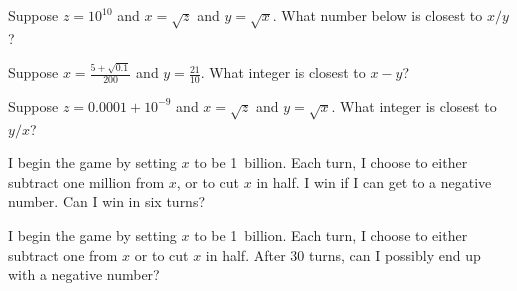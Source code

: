 \documentclass{ximera}
\begin{document}
\begin{shuffle}
\begin{problem}
  Suppose $z = 10^{10}$ and $x = \sqrt{z}$ and $y = \sqrt{x}$.  What number below is closest to $x/y$?
  \begin{multipleChoice}
  \end{multipleChoice}
\end{problem}

\begin{problem}
  Suppose $x = \frac{5 + \sqrt{0.1}}{200}$ and $y = \frac{21}{10}$.  What integer is closest to $x - y$?
  \begin{multipleChoice}
  \end{multipleChoice}
\end{problem}

\begin{problem}
  Suppose $z = 0.0001 + 10^{-9}$ and $x = \sqrt{z}$ and $y = \sqrt{x}$.  What integer is closest to $y/x$?
  \begin{multipleChoice}
  \end{multipleChoice}
\end{problem}

\begin{problem}
  I begin the game by setting $x$ to be 1~billion.  Each turn, I
  choose to either subtract one million from $x$, or to cut $x$ in
  half.  I win if I can get to a negative number.  Can I win in six
  turns?
  \begin{multipleChoice}
  \end{multipleChoice}
\end{problem}

\begin{problem}
  I begin the game by setting $x$ to be 1~billion.  Each turn, I
  choose to either subtract one from $x$ or to cut $x$ in half.  After
  30 turns, can I possibly end up with a negative number?
  \begin{multipleChoice}
  \end{multipleChoice}
\end{problem}





\end{shuffle}
\end{document}
